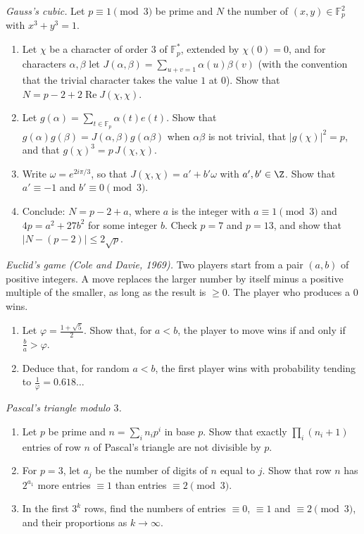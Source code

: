 \begin{exercise}[$\star\star\star$]\label{pb:fermatcubic}
\emph{Gauss's cubic.} Let $p\equiv1\pmod3$ be prime and $N$ the number of $(x,y)\in\mathbb F_p^2$ with $x^3+y^3=1$.
\begin{enumerate}[label=(\alph*)]
\item Let $\chi$ be a character of order $3$ of $\mathbb F_p^*$, extended by $\chi(0)=0$, and for characters $\alpha,\beta$
let $J(\alpha,\beta)=\sum_{u+v=1}\alpha(u)\beta(v)$ (with the convention that the trivial character takes the value $1$ at $0$).
Show that $N=p-2+2\operatorname{Re}J(\chi,\chi)$.
\item Let $g(\alpha)=\sum_{t\in\mathbb F_p}\alpha(t)e(t)$. Show that $g(\alpha)g(\beta)=J(\alpha,\beta)g(\alpha\beta)$ when
$\alpha\beta$ is not trivial, that $|g(\chi)|^2=p$, and that $g(\chi)^3=p\,J(\chi,\chi)$.
\item Write $\omega=e^{2i\pi/3}$, so that $J(\chi,\chi)=a'+b'\omega$ with $a',b'\in\Z$. Show that $a'\equiv-1$ and
$b'\equiv0\pmod 3$.
\item Conclude: $N=p-2+a$, where $a$ is the integer with $a\equiv1\pmod3$ and $4p=a^2+27b^2$ for some integer $b$. Check $p=7$
and $p=13$, and show that $|N-(p-2)|\le2\sqrt p$.
\end{enumerate}
\end{exercise}

\begin{exercise}[$\star\star$]\label{pb:euclidgame}
\emph{Euclid's game (Cole and Davie, 1969).} Two players start from a pair $(a,b)$ of positive integers. A move replaces the larger
number by itself minus a positive multiple of the smaller, as long as the result is $\ge0$. The player who produces a $0$ wins.
\begin{enumerate}[label=(\alph*)]
\item Let $\varphi=\frac{1+\sqrt5}2$. Show that, for $a<b$, the player to move wins if and only if $\frac ba>\varphi$.
\item Deduce that, for random $a<b$, the first player wins with probability tending to $\frac1\varphi=0.618\ldots$
\end{enumerate}
\end{exercise}

\begin{exercise}[$\star\star$]\label{pb:pascalthree}
\emph{Pascal's triangle modulo $3$.}
\begin{enumerate}[label=(\alph*)]
\item Let $p$ be prime and $n=\sum_in_ip^i$ in base $p$. Show that exactly $\prod_i(n_i+1)$ entries of row $n$ of Pascal's triangle
are not divisible by $p$.
\item For $p=3$, let $a_j$ be the number of digits of $n$ equal to $j$. Show that row $n$ has $2^{a_1}$ more entries $\equiv1$ than
entries $\equiv2\pmod3$.
\item In the first $3^k$ rows, find the numbers of entries $\equiv0$, $\equiv1$ and $\equiv2\pmod3$, and their proportions as
$k\to\infty$.
\end{enumerate}
\end{exercise}


